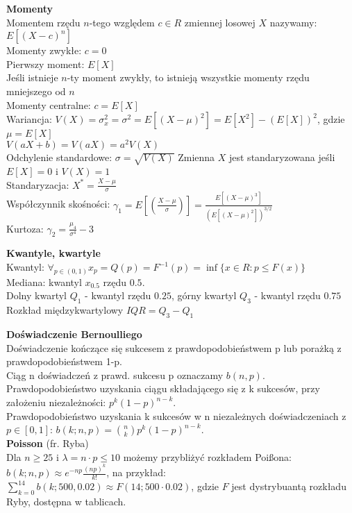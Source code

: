 \documentclass[10pt,landscape,a4paper,notitlepage]{article}
\begin{document}
\begin{multicols*}{4}
        \noindent\textbf{\large Momenty}\\
        Momentem rzędu $n$-tego względem $c\in R$ zmiennej losowej $X$ nazywamy: $E[(X-c)^n]$\\
        Momenty zwykłe: $c=0$\\
        Pierwszy moment: $E[X]$\\
        Jeśli istnieje $n$-ty moment zwykły, to istnieją wszystkie momenty rzędu mniejszego od $n$\\
        Momenty centralne: $c=E[X]$\\
        Wariancja: $V(X)=\sigma_x^2=\sigma^2=E[(X-\mu)^2]=E[X^2]-(E[X])^2$, gdzie $\mu=E[X]$\\
        $V(aX+b)=V(aX)=a^2V(X)$\\
        Odchylenie standardowe: $\sigma=\sqrt{V(X)}$
        Zmienna $X$ jest standaryzowana jeśli $E[X]=0$ i $V(X)=1$\\
        Standaryzacja: $X^*=\frac{X-\mu}{\sigma}$\\
        Współczynnik skośności: $\gamma_1=E\left[\left(\frac{X-\mu}{\sigma}\right)\right]=\frac{E[(X-\mu)^3]}{(E[(X-\mu)^2])^{3/2}}$\\
        Kurtoza: $\gamma_2=\frac{\mu_4}{\sigma^4}-3$

        \noindent\textbf{\large Kwantyle, kwartyle}\\
        Kwantyl: $\forall_{p\in(0,1)} x_p=Q(p)=F^{-1}(p)=\inf \{x\in R:p\leq F(x)\}$\\
        Mediana: kwantyl $x_{0.5}$ rzędu $0.5$.\\
        Dolny kwartyl $Q_1$ - kwantyl rzędu $0.25$, górny kwartyl $Q_3$ - kwantyl rzędu $0.75$\\
        Rozkład międzykwartylowy $IQR=Q_3-Q_1$

        \noindent \textbf{\large Doświadczenie Bernoulliego}\\
        Doświadczenie kończące się sukcesem z prawdopodobieństwem p lub porażką z prawdopodobieństwem 1-p.\\
        Ciąg n doświadczeń z prawd. sukcesu p oznaczamy $b(n,p)$.\\
        Prawdopodobieństwo uzyskania ciągu składającego się z k sukcesów, przy założeniu niezależności: $p^k(1-p)^{n-k}$.\\
        Prawdopodobieństwo uzyskania k sukcesów w n niezależnych doświadczeniach z $p\in[0,1]$: $b(k;n,p)=\binom{n}{k}p^k(1-p)^{n-k}$.\\
        \textbf{Poisson} (fr. Ryba)\\
        Dla $n\geq25$ i $\lambda = n\cdot p \leq10$ możemy przybliżyć rozkładem Poi\ss ona: $b(k;n,p)\approx e^{-np}\frac{(np)^k}{k!}$, na przykład:\\
        $\sum_{k=0}^{14}b(k;500,0.02)\approx F(14;500\cdot0.02)$, gdzie $F$ jest dystrybuantą rozkładu Ryby, dostępna w tablicach.


\end{multicols*}
\end{document}
